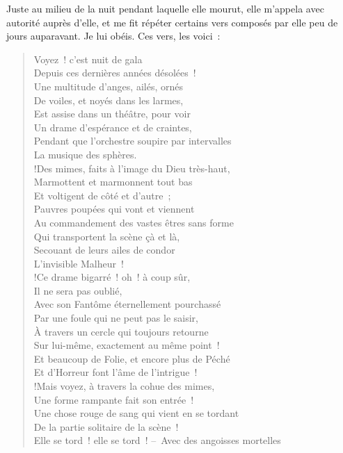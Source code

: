 \documentclass[french,twoside]{book} %
\begin{document}
Juste au milieu de la nuit pendant laquelle elle mourut, elle m’appela avec autorité auprès d’elle, et me fit répéter certains vers composés par elle peu de jours auparavant. Je lui obéis. Ces vers, les voici :\par


\begin{verse}
Voyez ! c’est nuit de gala\\
Depuis ces dernières années désolées !\\
Une multitude d’anges, ailés, ornés\\
De voiles, et noyés dans les larmes,\\
Est assise dans un théâtre, pour voir\\
Un drame d’espérance et de craintes,\\
Pendant que l’orchestre soupire par intervalles\\
La musique des sphères.\\!Des mimes, faits à l’image du Dieu très-haut,\\
Marmottent et marmonnent tout bas\\
Et voltigent de côté et d’autre ;\\
Pauvres poupées qui vont et viennent\\
Au commandement des vastes êtres sans forme\\
Qui transportent la scène çà et là,\\
Secouant de leurs ailes de condor\\
L’invisible Malheur !\\!Ce drame bigarré ! oh ! à coup sûr,\\
Il ne sera pas oublié,\\
Avec son Fantôme éternellement pourchassé\\
Par une foule qui ne peut pas le saisir,\\
À travers un cercle qui toujours retourne\\
Sur lui-même, exactement au même point !\\
Et beaucoup de Folie, et encore plus de Péché\\
Et d’Horreur font l’âme de l’intrigue !\\!Mais voyez, à travers la cohue des mimes,\\
Une forme rampante fait son entrée !\\
Une chose rouge de sang qui vient en se tordant\\
De la partie solitaire de la scène !\\
Elle se tord ! elle se tord ! – Avec des angoisses mortelles\\

\end{verse}
\end{document}
